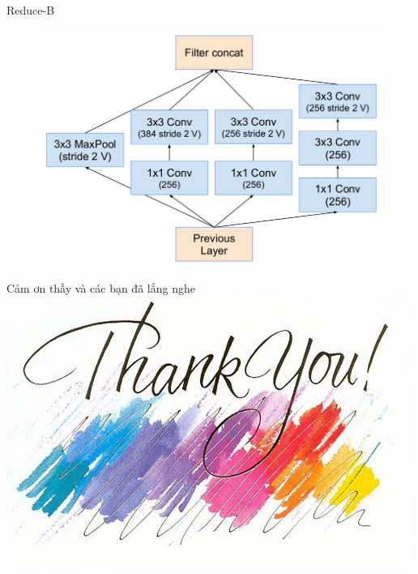 \documentclass[compress]{beamer}
\begin{document}
\begin{frame}{Reduce-B}
\begin{figure}[H]
\includegraphics[scale=0.3]{reduceB.png}
\end{figure}
\end{frame}
\begin{frame}{Cảm ơn thầy và các bạn đã lắng nghe}
\includegraphics[scale=0.6]{thanks.jpg}
\end{frame}
\end{document}
